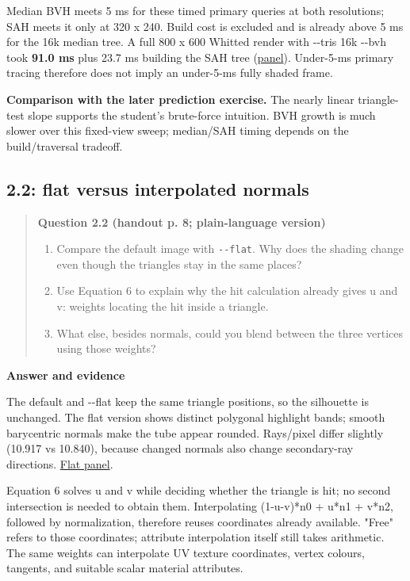 \documentclass[11pt,a4paper]{article}
\begin{document}
Median BVH meets 5 ms for these timed primary queries at both resolutions; SAH meets it only at 320 x 240. Build cost is excluded and is already above 5 ms for the 16k median tree. A full 800 x 600 Whitted render with -{}-tris 16k -{}-bvh took \textbf{91.0 ms} plus 23.7 ms building the SAH tree (\href{https://github.com/Champy2005/Lab09-RayTracing/blob/main/evidence/terminal/P2-16k-full-bvh.txt}{panel}). Under-5-ms primary tracing therefore does not imply an under-5-ms fully shaded frame.


\textbf{Comparison with the later prediction exercise.} The nearly linear triangle-test slope supports the student's brute-force intuition. BVH growth is much slower over this fixed-view sweep; median/\allowbreak{}SAH timing depends on the build/\allowbreak{}traversal tradeoff.


\subsection*{2.2: flat versus interpolated normals}
\begin{quote}\small
\textbf{Question 2.2 (handout p. 8; plain-language version)}


\begin{enumerate}
\item Compare the default image with \texttt{-{}-flat}. Why does the shading change even though the triangles stay in the same places?
\item Use Equation 6 to explain why the hit calculation already gives u and v: weights locating the hit inside a triangle.
\item What else, besides normals, could you blend between the three vertices using those weights?
\end{enumerate}\end{quote}
\textbf{Answer and evidence}


The default and -{}-flat keep the same triangle positions, so the silhouette is unchanged. The flat version shows distinct polygonal highlight bands; smooth barycentric normals make the tube appear rounded. Rays/\allowbreak{}pixel differ slightly (10.917 vs 10.840), because changed normals also change secondary-ray directions. \href{https://github.com/Champy2005/Lab09-RayTracing/blob/main/evidence/terminal/P2-flat.txt}{Flat panel}.


Equation 6 solves u and v while deciding whether the triangle is hit; no second intersection is needed to obtain them. Interpolating (1-u-v)*n0 + u*n1 + v*n2, followed by normalization, therefore reuses coordinates already available. "Free" refers to those coordinates; attribute interpolation itself still takes arithmetic. The same weights can interpolate UV texture coordinates, vertex colours, tangents, and suitable scalar material attributes.
\end{document}
